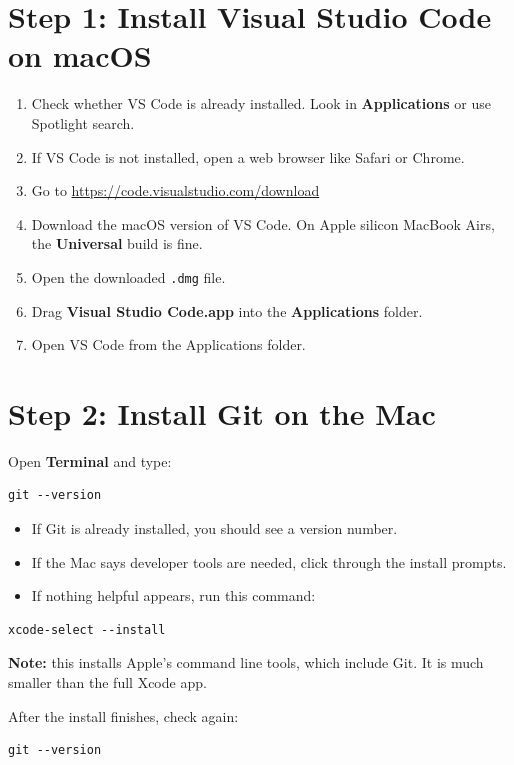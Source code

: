\documentclass[11pt,letterpaper]{article}
\begin{document}
\section*{Step 1: Install Visual Studio Code on macOS}
\begin{enumerate}
    \item Check whether VS Code is already installed. Look in \textbf{Applications} or use Spotlight search.
    \item If VS Code is not installed, open a web browser like Safari or Chrome.
    \item Go to \url{https://code.visualstudio.com/download}
    \item Download the macOS version of VS Code. On Apple silicon MacBook Airs, the \textbf{Universal} build is fine.
    \item Open the downloaded \texttt{.dmg} file.
    \item Drag \textbf{Visual Studio Code.app} into the \textbf{Applications} folder.
    \item Open VS Code from the Applications folder.
\end{enumerate}

\section*{Step 2: Install Git on the Mac}
Open \textbf{Terminal} and type:

\begin{verbatim}
git --version
\end{verbatim}

\begin{itemize}
    \item If Git is already installed, you should see a version number.
    \item If the Mac says developer tools are needed, click through the install prompts.
    \item If nothing helpful appears, run this command:
\end{itemize}

\begin{verbatim}
xcode-select --install
\end{verbatim}

\textbf{Note:} this installs Apple's command line tools, which include Git. It is much smaller than the full Xcode app.

After the install finishes, check again:

\begin{verbatim}
git --version
\end{verbatim}
\end{document}
